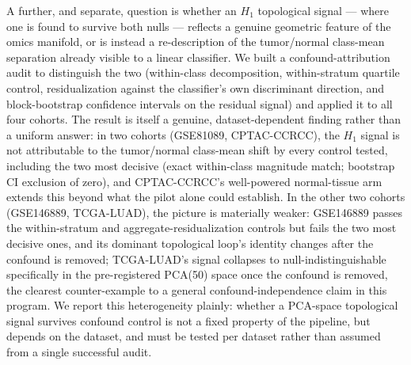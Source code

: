 A further, and separate, question is whether an $H_1$ topological signal --- where one is found to survive both nulls --- reflects a genuine geometric feature of the omics manifold, or is instead a re-description of the tumor/normal class-mean separation already visible to a linear classifier. We built a confound-attribution audit to distinguish the two (within-class decomposition, within-stratum quartile control, residualization against the classifier's own discriminant direction, and block-bootstrap confidence intervals on the residual signal) and applied it to all four cohorts. The result is itself a genuine, dataset-dependent finding rather than a uniform answer: in two cohorts (GSE81089, CPTAC-CCRCC), the $H_1$ signal is not attributable to the tumor/normal class-mean shift by every control tested, including the two most decisive (exact within-class magnitude match; bootstrap CI exclusion of zero), and CPTAC-CCRCC's well-powered normal-tissue arm extends this beyond what the pilot alone could establish. In the other two cohorts (GSE146889, TCGA-LUAD), the picture is materially weaker: GSE146889 passes the within-stratum and aggregate-residualization controls but fails the two most decisive ones, and its dominant topological loop's identity changes after the confound is removed; TCGA-LUAD's signal collapses to null-indistinguishable specifically in the pre-registered PCA(50) space once the confound is removed, the clearest counter-example to a general confound-independence claim in this program. We report this heterogeneity plainly: whether a PCA-space topological signal survives confound control is not a fixed property of the pipeline, but depends on the dataset, and must be tested per dataset rather than assumed from a single successful audit.
